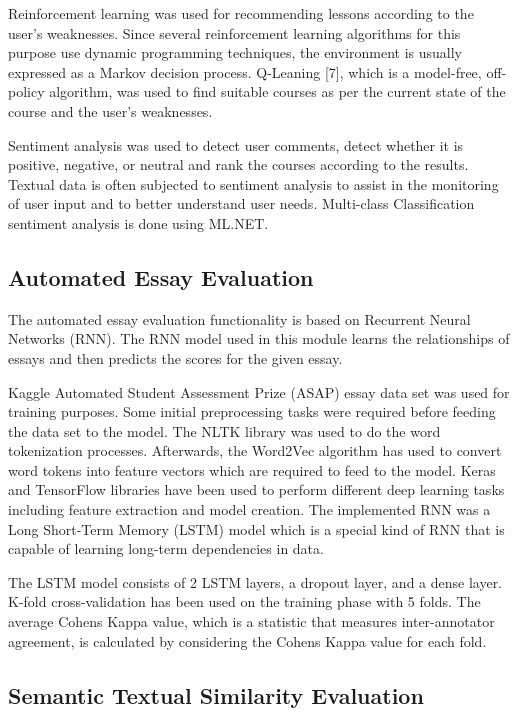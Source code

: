 \documentclass[conference]{IEEEtran}
\begin{document}
Reinforcement learning was used for recommending lessons according to the user’s weaknesses. Since several reinforcement learning algorithms for this purpose use dynamic programming techniques, the environment is usually expressed as a Markov decision process. Q-Leaning [7], which is a model-free, off-policy algorithm, was used to find suitable courses as per the current state of the course and the user’s weaknesses.

Sentiment analysis was used to detect user comments, detect whether it is positive, negative, or neutral and rank the courses according to the results. Textual data is often subjected to sentiment analysis to assist in the monitoring of user input and to better understand user needs. Multi-class Classification sentiment analysis is done using ML.NET.

\subsection{Automated Essay Evaluation}

The automated essay evaluation functionality is based on Recurrent Neural Networks (RNN). The RNN model used in this module learns the relationships of essays and then predicts the scores for the given essay.

Kaggle Automated Student Assessment Prize (ASAP) essay data set was used for training purposes. Some initial preprocessing tasks were required before feeding the data set to the model. The NLTK library was used to do the word tokenization processes. Afterwards, the Word2Vec algorithm has used to convert word tokens into feature vectors which are required to feed to the model. Keras and TensorFlow libraries have been used to perform different deep learning tasks including feature extraction and model creation. The implemented RNN was a Long Short-Term Memory (LSTM) model which is a special kind of RNN that is capable of learning long-term dependencies in data.

The LSTM model consists of 2 LSTM layers, a dropout layer, and a dense layer. K-fold cross-validation has been used on the training phase with 5 folds. The average Cohens Kappa value, which is a statistic that measures inter-annotator agreement, is calculated by considering the Cohens Kappa value for each fold.

\subsection{Semantic Textual Similarity Evaluation}
\end{document}

